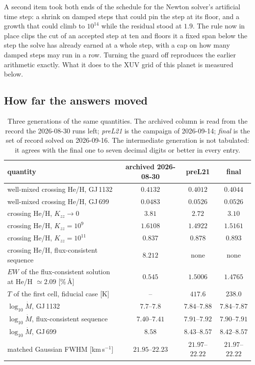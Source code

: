 \documentclass[english,a4paper]{my_memo}
\begin{document}
A second item took both ends of the schedule for the Newton solver's
artificial time step: a shrink on damped steps that could pin the step at its
floor, and a growth that could climb to $10^{14}$ while the residual stood at
$1.9$. The rule now in place clips the cut of an accepted step at ten and
floors it a fixed span below the step the solve has already earned at a whole
step, with a cap on how many damped steps may run in a row. Turning the guard
off reproduces the earlier arithmetic exactly. What it does to the XUV grid
of this planet is measured below.

\subsection{How far the answers moved}

\begin{table}[h]
\centering
\caption{Three generations of the same quantities. The archived column is
read from the record the 2026-08-30 runs left; \emph{preL21} is the campaign
of 2026-09-14; \emph{final} is the set of record solved on 2026-09-16. The
intermediate generation is not tabulated: it agrees with the final one to
seven decimal digits or better in every entry.}
\label{tab:moved}
\begin{tabular}{lccc}
\toprule
quantity & archived 2026-08-30 & preL21 & final \\
\midrule
well-mixed crossing He/H, GJ\,1132 & $0.4132$ & $0.4012$ & $0.4044$ \\
well-mixed crossing He/H, GJ\,699 & $0.0483$ & $0.0526$ & $0.0526$ \\
crossing He/H, $K_{zz} \to 0$ & $3.81$ & $2.72$ & $3.10$ \\
crossing He/H, $K_{zz} = 10^{9}$ & $1.6108$ & $1.4922$ & $1.5161$ \\
crossing He/H, $K_{zz} = 10^{11}$ & $0.837$ & $0.878$ & $0.893$ \\
crossing He/H, flux-consistent sequence & $8.212$ & none & none \\
$EW$ of the flux-consistent solution at He/H $\simeq 2.09$ [\%\,\AA] & $0.545$ & $1.5006$ & $1.4765$ \\
$T$ of the first cell, fiducial case [K] & -- & $417.6$ & $238.0$ \\
$\log_{10}\dot M$, GJ\,1132 & $7.7$--$7.8$ & $7.84$--$7.88$ & $7.84$--$7.87$ \\
$\log_{10}\dot M$, flux-consistent sequence & $7.40$--$7.41$ & $7.91$--$7.92$ & $7.90$--$7.91$ \\
$\log_{10}\dot M$, GJ\,699 & $8.58$ & $8.43$--$8.57$ & $8.42$--$8.57$ \\
matched Gaussian FWHM [km\,s$^{-1}$] & $21.95$--$22.23$ & $21.97$--$22.22$ & $21.97$--$22.22$ \\
\bottomrule
\end{tabular}
\end{table}
\end{document}
